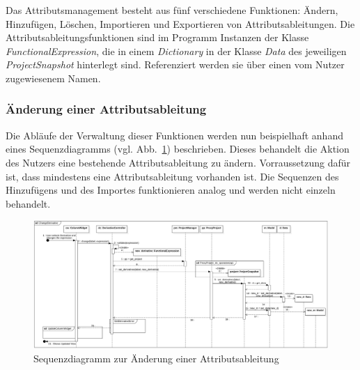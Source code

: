 \documentclass{article}
\begin{document}
Das Attributsmanagement besteht aus fünf verschiedene Funktionen: Ändern, Hinzufügen, Löschen, Importieren und Exportieren von Attributsableitungen. Die Attributsableitungsfunktionen sind im Programm Instanzen der Klasse \textit{FunctionalExpression}, die in einem \textit{Dictionary} in der Klasse \textit{Data} des jeweiligen \textit{ProjectSnapshot} hinterlegt sind. Referenziert werden sie über einen vom Nutzer zugewiesenem Namen.

\subsubsection{Änderung einer Attributsableitung} \label{sec:Änderung einer Attributsableitung}
Die Abläufe der Verwaltung dieser Funktionen werden nun beispielhaft anhand eines Sequenzdiagramms (vgl. Abb.~\ref{fig:sq:ChangeDerivativeSequenceDiagram}) beschrieben. Dieses behandelt die Aktion des Nutzers eine bestehende Attributsableitung zu ändern. Vorraussetzung dafür ist, dass mindestens eine Attributsableitung vorhanden ist. Die Sequenzen des Hinzufügens und des Importes funktionieren analog und werden nicht einzeln behandelt.

\begin{figure}[H]%
    \centering
    \includegraphics[width=12cm]{entwurf/Floriane/ChangeDerivative.png}
    \caption{Sequenzdiagramm zur Änderung einer Attributsableitung}
    \label{fig:sq:ChangeDerivativeSequenceDiagram}
\end{figure}
\end{document}
